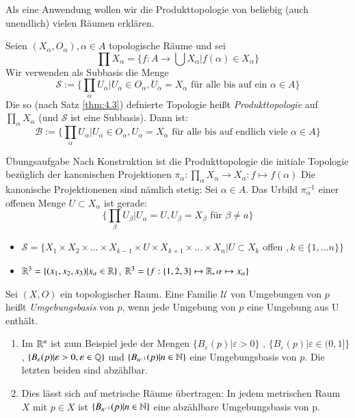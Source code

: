 \documentclass[a4paper,10pt]{scrartcl}
\newcommand{\eps}{\varepsilon}
\renewcommand{\bigsqcap}{\prod}
\begin{document}
Als eine Anwendung wollen wir die Produkttopologie von beliebig (auch unendlich) vielen Räumen erklären.

Seien $(X_\alpha,O_\alpha), \alpha \in A$ topologische Räume und sei
\[
 \bigsqcap X_\alpha=\{f:A\to\bigcup X_\alpha|f(\alpha)\in X_\alpha\}
\]
Wir verwenden als Subbasis die Menge
\[
 \mathcal S:=\{\bigsqcap_\alpha U_\alpha|U_\alpha \in O_\alpha, U_\alpha=X_\alpha \text{ für alle bis auf ein $\alpha \in A$}\}
\]
Die so (nach Satz \ref{thm:4.3}) defnierte Topologie heißt \emph{Produkttopologie} auf $\bigsqcap_\alpha X_\alpha$ (und 
$\mathcal S$ ist eine Subbasis). Dann ist:
\[
 \mathcal B := \{ \bigsqcap_\alpha U_\alpha|U_\alpha\in O_\alpha, U_\alpha=X_\alpha \text{ für alle bis auf endlich viele } \alpha \in A\}
\]
\begin{seg}{Übungsaufgabe}
 Nach Konstruktion ist die Produkttopologie die initiale Topologie bezüglich der kanonischen Projektionen $\pi_\alpha:\bigsqcap_\alpha X_\alpha\to X_\alpha: f\mapsto f(\alpha)$
Die kanonische Projektionenen sind nämlich stetig: Sei $\alpha \in A$. Das Urbild $\pi_\alpha^{-1}$ einer offenen Menge $U\subset X_\alpha$ ist gerade:
\[
 \{\bigsqcap_\beta U_\beta|U_\alpha=U, U_\beta=X_\beta \text{ für } \beta\neq a\}
\]

\end{seg}
\begin{note*}
 \begin{itemize}
  \item $\mathcal S=\{X_1\times X_2\times ... \times X_{k-1} \times U \times X_{k+1} \times...\times X_n |U\subset X_k$ offen $, k \in \{1, \dotsc n \} \} $
  \item $\mathbb{R}^3=\{(x_1,x_2,x_3)|x_\alpha\in \mathbb{R}\}$, $\mathbb{R}^3=\{f:\{1,2,3\}\mapsto \mathbb{R}, \alpha\mapsto x_\alpha\}$
 \end{itemize}
\end{note*}
\begin{df}
 Sei $(X,O)$ ein topologischer Raum. Eine Familie $\mathcal U$ von Umgebungen von $p$ heißt \emph{Umgebungsbasis} von $p$, wenn jede Umgebung von $p$ eine Umgebung aus U enthält.
\fixme[fig25]
\end{df}
\begin{exs*}
 \begin{enumerate}
\item  Im $\mathbb{R}^n$ ist zum Beispiel jede der Mengen $\{B_\eps(p)|\eps>0\}$ , $ \{B_\eps(p)|\eps\in (0,1]\}$, $\{ B_\eps(p)|\eps>0,\eps\in \Q \}$ und $\{B_{n^{-1}}(p)|n\in \mathbb{N}\}$ eine Umgebungsbasis von $p$. Die letzten beiden sind abzählbar.
\item Dies lässt sich auf metrische Räume übertragen: In jedem metrischen Raum $X$ mit $p\in X$ ist $\{B_{n^{-1}}(p)|n\in \mathbb{N}\}$ eine abzählbare Umgebungsbasis von p.
 \end{enumerate}
\end{exs*}
\end{document}
